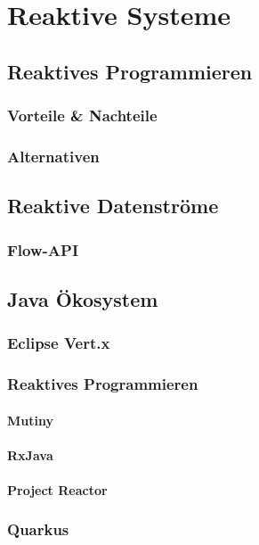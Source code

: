 \section{Reaktive Systeme}
\label{sec:reaktive systeme}

\subsection{Reaktives Programmieren}
\label{subsec:reaktives_programmieren}

\subsubsection{Vorteile \& Nachteile}
\label{subsubsec:vorteile_nachteile}

\subsubsection{Alternativen}
\label{subsubsec:alternativen}

\subsection{Reaktive Datenströme}
\label{subsec:reaktive_datenströme}

\subsubsection{Flow-API}
\label{subsubsec:flow_api}


\subsection{Java Ökosystem}
\label{subsec:java_ökosystem}

\subsubsection{Eclipse Vert.x}
\label{subsubsec:vert.x}

\subsubsection{Reaktives Programmieren}
\label{subsubsec:reaktives_programmieren}
\paragraph{Mutiny}
\paragraph{RxJava}
\paragraph{Project Reactor}

\subsubsection{Quarkus}
\label{subsubsec:quarkus}
